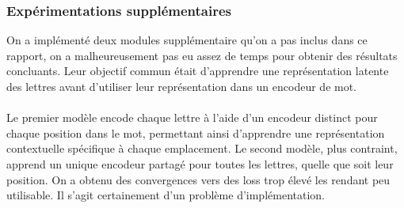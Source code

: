 \documentclass{article}
\begin{document}
\subsubsection{Expérimentations supplémentaires}
On a implémenté deux modules supplémentaire qu'on a pas inclus dans ce rapport, on a malheureusement pas eu assez de temps pour obtenir des résultats concluants. Leur objectif commun était d'apprendre une représentation latente des lettres avant d'utiliser leur représentation dans un encodeur de mot. 
\\ \\
Le premier modèle encode chaque lettre à l’aide d’un encodeur distinct pour chaque position dans le mot, permettant ainsi d’apprendre une représentation contextuelle spécifique à chaque emplacement. Le second modèle, plus contraint, apprend un unique encodeur partagé pour toutes les lettres, quelle que soit leur position. On a obtenu des convergences vers des loss trop élevé les rendant peu utilisable. Il s'agit certainement d'un problème d'implémentation.
\end{document}
